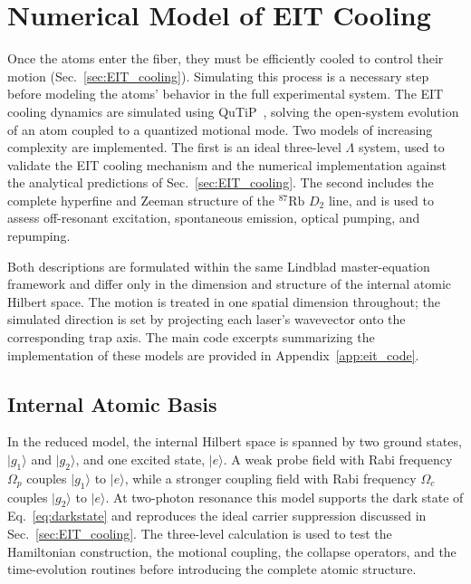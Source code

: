 \section{Numerical Model of EIT Cooling}
\label{sec:numerical_eit}

Once the atoms enter the fiber, they must be efficiently cooled to control their motion (Sec.~\ref{sec:EIT_cooling}). Simulating this process is a necessary step before modeling the atoms' behavior in the full experimental system. The EIT cooling dynamics are simulated using QuTiP~\cite{Johansson2012}, solving the open-system evolution of an atom coupled to a quantized motional mode. Two models of increasing complexity are implemented. The first is an ideal three-level $\Lambda$ system, used to validate the EIT cooling mechanism and the numerical implementation against the analytical predictions of Sec.~\ref{sec:EIT_cooling}. The second includes the complete hyperfine and Zeeman structure of the $^{87}\mathrm{Rb}$ $D_2$ line, and is used to assess off-resonant excitation, spontaneous emission, optical pumping, and repumping.

Both descriptions are formulated within the same Lindblad master-equation framework and differ only in the dimension and structure of the internal atomic Hilbert space. The motion is treated in one spatial dimension throughout; the simulated direction is set by projecting each laser's wavevector onto the corresponding trap axis. The main code excerpts summarizing the implementation of these models are provided in Appendix~\ref{app:eit_code}.

\subsection{Internal Atomic Basis}
\label{subsec:atomic_basis}

In the reduced model, the internal Hilbert space is spanned by two ground states, $|g_1\rangle$ and $|g_2\rangle$, and one excited state, $|e\rangle$. A weak probe field with Rabi frequency $\Omega_p$ couples $|g_1\rangle$ to $|e\rangle$, while a stronger coupling field with Rabi frequency $\Omega_c$ couples $|g_2\rangle$ to $|e\rangle$. At two-photon resonance this model supports the dark state of Eq.~\eqref{eq:darkstate} and reproduces the ideal carrier suppression discussed in Sec.~\ref{sec:EIT_cooling}. The three-level calculation is used to test the Hamiltonian construction, the motional coupling, the collapse operators, and the time-evolution routines before introducing the complete atomic structure.

